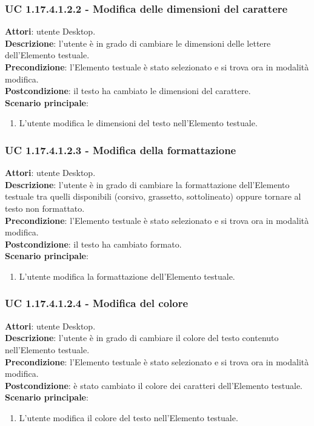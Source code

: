 \subsubsection{UC 1.17.4.1.2.2 - Modifica delle dimensioni del carattere}{
	\label{uc1.17.4.1.2.2}
	\textbf{Attori}: utente Desktop. \\
	\textbf{Descrizione}: l'utente è in grado di cambiare le dimensioni delle lettere dell’Elemento testuale. \\
	\textbf{Precondizione}: l'Elemento testuale è stato selezionato e si trova ora in modalità modifica.\\
	\textbf{Postcondizione}: il testo ha cambiato le dimensioni del carattere.\\
	\textbf{Scenario principale}:
	\begin{enumerate}
		\item L'utente modifica le dimensioni del testo nell'Elemento testuale.
	\end{enumerate}	
	}
\subsubsection{UC 1.17.4.1.2.3 - Modifica della formattazione}{
	\label{uc1.17.4.1.2.3}
	\textbf{Attori}: utente Desktop. \\
	\textbf{Descrizione}: l'utente è in grado di cambiare la formattazione dell’Elemento testuale tra quelli disponibili (corsivo, grassetto, sottolineato) oppure tornare al testo non formattato. \\
	\textbf{Precondizione}: l'Elemento testuale è stato selezionato e si trova ora in modalità modifica.\\
	\textbf{Postcondizione}: il testo ha cambiato formato.\\
	\textbf{Scenario principale}:
	\begin{enumerate}
		\item L'utente modifica la formattazione dell'Elemento testuale.
	\end{enumerate}			
	}
\subsubsection{UC 1.17.4.1.2.4 - Modifica del colore}{
	\label{uc1.17.4.1.2.4}
	\textbf{Attori}: utente Desktop. \\
	\textbf{Descrizione}: l'utente è in grado di cambiare il colore del testo contenuto nell’Elemento testuale. \\
	\textbf{Precondizione}: l'Elemento testuale è stato selezionato e si trova ora in modalità modifica.\\
	\textbf{Postcondizione}: è stato cambiato il colore dei caratteri dell'Elemento testuale.\\
	\textbf{Scenario principale}:
	\begin{enumerate}
		\item L'utente modifica il colore del testo nell'Elemento testuale.
	\end{enumerate}			
	}
